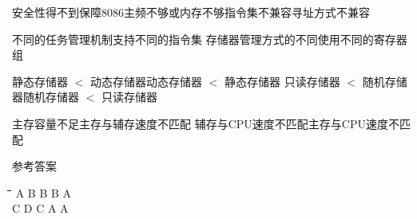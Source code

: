 \documentclass[12pt]{article}
\begin{document}
\begin{frame}{}
{安全性得不到保障}{8086主频不够或内存不够}{指令集不兼容}{寻址方式不兼容}
\end{frame}

\begin{frame}{}
{不同的任务管理机制}{支持不同的指令集}
{存储器管理方式的不同}{使用不同的寄存器组}
\end{frame}

\begin{frame}{}
{静态存储器 $<$ 动态存储器}{动态存储器 $<$ 静态存储器}
{只读存储器 $<$ 随机存储器}{随机存储器 $<$ 只读存储器}
\end{frame}

\begin{frame}{}
{主存容量不足}{主存与辅存速度不匹配}
{辅存与CPU速度不匹配}{主存与CPU速度不匹配}
\end{frame}

\begin{frame}{}
   \begin{block}{参考答案}
           \centering

   \begin{tabbing}
      \hspace{.1\textwidth}\=
      \hspace{.1\textwidth}\=
      \hspace{.1\textwidth}\=
      \hspace{.1\textwidth}\=
      \hspace{.1\textwidth}\=
      \hspace{.1\textwidth}\=\kill
      \> A \> B \> B \> B \> A \\
      \> C \> D \> C \> A \> A
    \end{tabbing}
   \end{block}
\end{frame}
\end{document}
